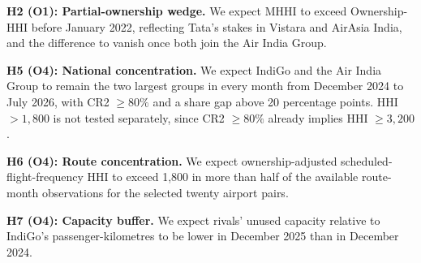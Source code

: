 \documentclass[12pt,a4paper]{article}
\newif\ifoneon
\newcommand{\oneHL}{\par\oneontrue\color{orange}\captionsetup{font+={color=blue}}}
\begin{document}
{\oneHL \textbf{H2 (O1): Partial-ownership wedge.} We expect MHHI to exceed Ownership-HHI before January 2022, reflecting Tata's stakes in Vistara and AirAsia India, and the difference to vanish once both join the Air India Group.\par}

\textbf{H5 (O4): National concentration.} We expect IndiGo and the Air India Group to remain the two largest groups in every month from December 2024 to July 2026, with CR2 $\geq80\%$ and a share gap above 20 percentage points. HHI $>1{,}800$ is not tested separately, since CR2 $\geq80\%$ already implies HHI $\geq3{,}200$.

\textbf{H6 (O4): Route concentration.} We expect ownership-adjusted scheduled-flight-frequency HHI to exceed 1,800 in more than half of the available route-month observations for the selected twenty airport pairs.

\textbf{H7 (O4): Capacity buffer.} We expect rivals' unused capacity relative to IndiGo's passenger-kilometres to be lower in December 2025 than in December 2024.

\clearpage
\end{document}
